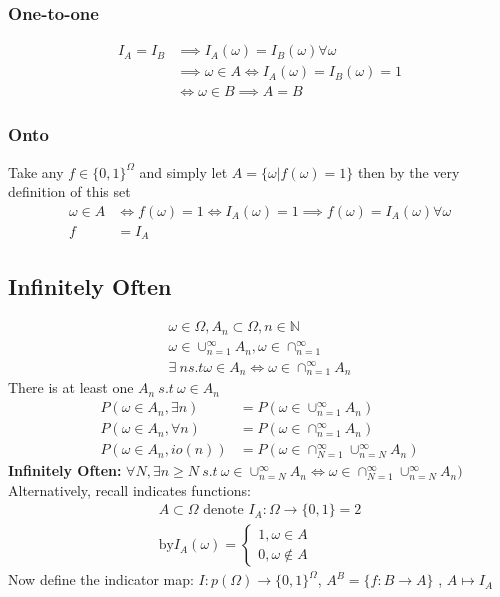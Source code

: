 \documentclass{article}
\theoremstyle{definition}
\theoremstyle{thrm}
\theoremstyle{lma}
\theoremstyle{ppst}
\theoremstyle{crlr}
\begin{document}
\subsubsection{One-to-one}
\begin{align*}
	I_A=I_B &\implies I_A(\omega) = I_B(\omega) \forall \omega\\
	&\implies \omega \in A \iff I_A(\omega) = I_B(\omega) =1 \\
	&\iff \omega \in B \implies A=B
\end{align*}
\subsubsection{Onto}
Take any $f\in \{0,1\}^\Omega$ and simply let $A=\{\omega| f(\omega) = 1\}$ then by the very definition of this set
\begin{align*}
	\omega \in A &\iff f(\omega)=1 \iff I_A(\omega) =1 \implies f(\omega)=I_A(\omega) \forall \omega\\
	f &= I_A
\end{align*}
\subsection{Infinitely Often}
\begin{align*}
	\omega \in \Omega, A_n \subset \Omega, n \in \mathbb{N}\\
	\omega \in \cup_{n=1}^\infty A_n, \omega \in \cap_{n=1}^\infty\\
	\exists \ n s.t \omega \in A_n \iff \omega \in \cap_{n=1}^\infty A_n
\end{align*}
There is at least one $A_n \ s.t\  \omega \in A_n$
\begin{align*}
	P(\omega \in A_n, \exists n ) &= P(\omega \in \cup_{n=1}^\infty A_n)\\
	P(\omega \in A_n, \forall n ) &= P(\omega \in \cap_{n=1}^\infty A_n)\\
	P(\omega \in A_n, io( n )) &= P(\omega \in \cap_{N=1}^\infty \cup_{n=N}^\infty A_n)
\end{align*}
\textbf{Infinitely Often:} $\forall N, \exists n \geq N \ s.t \ \omega \in \cup_{n=N}^\infty A_n \iff \omega \in \cap_{N=1}^\infty \cup_{n=N}^\infty A_n)$\\
Alternatively, recall indicates functions:
\begin{align*}
	A\subset \Omega \text{ denote } I_A: \Omega \rightarrow \{0,1\} =2\\
	\text{by} I_A(\omega) = 
	\begin{cases}
		1, \omega \in A\\
		0, \omega \notin A
	\end{cases} 
\end{align*}
Now define the indicator map: $I: p(\Omega) \rightarrow \{0,1\}^\Omega$,  $A^B = \{f: B\rightarrow A\}$ , $A\mapsto I_A$\\
\end{document}

